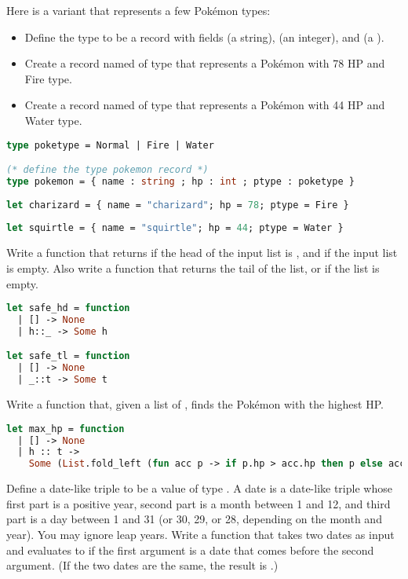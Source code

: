 \problem[pokerecord]
Here is a variant that represents a few Pokémon types:
\begin{itemize}
	\item Define the type  to be a record with fields  (a string),  (an integer), and  (a ).
	\item Create a record named  of type  that represents a Pokémon with 78 HP and Fire type.
	\item Create a record named  of type  that represents a Pokémon with 44 HP and Water type.
\end{itemize}

\begin{lstlisting}[language=OCaml]
type poketype = Normal | Fire | Water

(* define the type pokemon record *)
type pokemon = { name : string ; hp : int ; ptype : poketype }
	
let charizard = { name = "charizard"; hp = 78; ptype = Fire }
	
let squirtle = { name = "squirtle"; hp = 44; ptype = Water }
\end{lstlisting}

Write a function  that returns  if the head of the input list is , and  if the input list is empty.
Also write a function  that returns the tail of the list, or  if the list is empty.

\begin{lstlisting}[language=OCaml]
let safe_hd = function
  | [] -> None
  | h::_ -> Some h

let safe_tl = function
  | [] -> None
  | _::t -> Some t
\end{lstlisting}

\problem[pokefun]
Write a function  that, given a list of , finds the Pokémon with the highest HP.

\begin{lstlisting}[language=OCaml]
let max_hp = function
  | [] -> None
  | h :: t ->
    Some (List.fold_left (fun acc p -> if p.hp > acc.hp then p else acc) h t)
\end{lstlisting}

Define a date-like triple to be a value of type . A date is a date-like triple whose first part is a positive year, second part is a month between 1 and 12, and third part is a day between 1 and 31 (or 30, 29, or 28, depending on the month and year). You may ignore leap years.
Write a function  that takes two dates as input and evaluates to  if the first argument is a date that comes before the second argument. (If the two dates are the same, the result is .)

